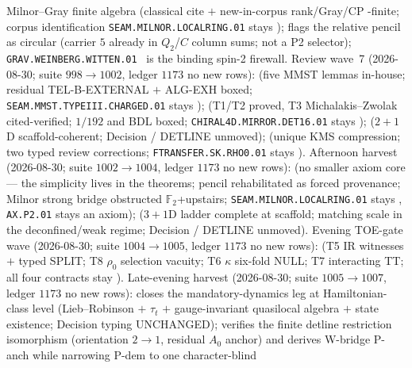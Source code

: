 \documentclass[11pt,a4paper]{article}
\begin{document}
Milnor--Gray finite algebra (classical cite $+$ new-in-corpus rank/Gray/CP \mE-finite;
corpus identification \texttt{SEAM.MILNOR.LOCALRING.01} stays \mO);
 flags the
relative pencil as circular (carrier $5$ already in $Q_2$/$C$ column sums; not a P2 selector);
\texttt{GRAV.WEINBERG.WITTEN.01} \mO\ is the binding spin-2 firewall.
Review wave~7 (2026-08-30; suite $998\to1002$, ledger $1173$ no new rows):
(five MMST lemmas in-house; residual TEL-B-EXTERNAL $+$ ALG-EXH boxed;
\texttt{SEAM.MMST.TYPEIII.CHARGED.01} stays \mO);
(T1/T2 proved, T3 Michalakis--Zwolak cited-verified; $1/192$ and BDL boxed;
\texttt{CHIRAL4D.MIRROR.DET16.01} stays \mC);
($2{+}1$D scaffold-coherent; Decision / DETLINE unmoved);
(unique KMS compression; two typed review corrections;
\texttt{FTRANSFER.SK.RHO0.01} stays \mO).
Afternoon harvest (2026-08-30; suite $1002\to1004$, ledger $1173$ no new rows):
(no smaller axiom core --- the simplicity lives in the theorems; pencil rehabilitated
as forced provenance; Milnor strong bridge obstructed $\mathbb F_2$+upstairs;
\texttt{SEAM.MILNOR.LOCALRING.01} stays \mO, \texttt{AX.P2.01} stays an axiom);
($3{+}1$D ladder complete at scaffold; matching scale in the deconfined/weak regime;
Decision / DETLINE unmoved).
Evening TOE-gate wave (2026-08-30; suite $1004\to1005$, ledger $1173$ no new rows):
(T5 IR witnesses $+$ typed SPLIT; T8 $\rho_0$ selection vacuity; T6 $\kappa$ six-fold NULL;
T7 interacting TT; all four contracts stay \mO).
Late-evening harvest (2026-08-30; suite $1005\to1007$, ledger $1173$ no new rows):
closes the mandatory-dynamics leg at Hamiltonian-class level (Lieb--Robinson $+$ $\tau_t$ $+$
gauge-invariant quasilocal algebra $+$ state existence; Decision typing UNCHANGED);
verifies the finite detline restriction isomorphism (orientation $2\to1$, residual $A_0$
anchor) and derives W-bridge P-anch while narrowing P-dem to one character-blind
\end{document}
